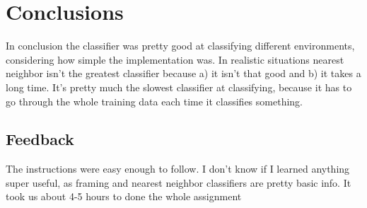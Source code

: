 \section{Conclusions}

In conclusion the classifier was pretty good at classifying different
environments, considering how simple the implementation was. In realistic
situations nearest neighbor isn't the greatest classifier because a) it isn't
that good and b) it takes a long time. It's pretty much the slowest classifier
at classifying, because it has to go through the whole training data each time
it classifies something.

\subsection{Feedback}
The instructions were easy enough to follow. I don't know if I learned anything
super useful, as framing and nearest neighbor classifiers are pretty basic
info. It took us about 4-5 hours to done the whole assignment
